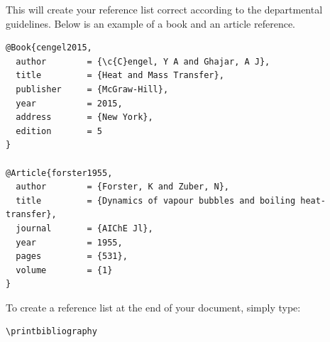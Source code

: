 \documentclass[a4paper,12pt]{article}
\begin{document}
This will create your reference list correct according to the departmental guidelines. Below is an example of a book and an article reference.

\begin{lstlisting}
@Book{cengel2015,
  author		= {\c{C}engel, Y A and Ghajar, A J},
  title			= {Heat and Mass Transfer},
  publisher		= {McGraw-Hill},
  year			= 2015,
  address		= {New York},
  edition		= 5
}

@Article{forster1955,
  author		= {Forster, K and Zuber, N},
  title			= {Dynamics of vapour bubbles and boiling heat-transfer},
  journal		= {AIChE Jl},
  year			= 1955,
  pages			= {531},
  volume		= {1}
}
\end{lstlisting}

To create a reference list at the end of your document, simply type: 
\begin{lstlisting}
\printbibliography
\end{lstlisting} 
\nocite{*}

\printbibliography
\newpage
\appendix
\renewcommand{\thefigure}{\thesection.\arabic{figure}}
\renewcommand{\thetable}{\thesection.\arabic{table}}
\renewcommand{\thepage}{\thesection.\arabic{page}}
\end{document}
